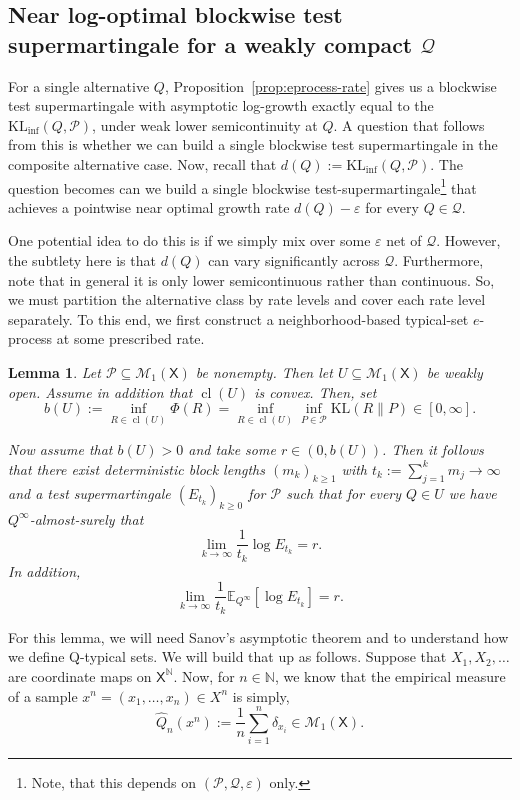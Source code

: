 \documentclass[11pt]{article}
\newcommand{\KL}{\mathrm{KL}}
\newcommand{\KLinf}{\mathrm{KL}_{\mathrm{inf}}}
\newcommand{\E}{\mathbb{E}}
\newcommand{\Pcal}{\mathcal{P}}
\newcommand{\Qcal}{\mathcal{Q}}
\newcommand{\X}{\mathsf{X}}
\DeclareMathOperator{\cl}{cl}
\newtheorem{lemma}[theorem]{Lemma}
\theoremstyle{definition}
\theoremstyle{definition}
\begin{document}
\subsection{Near log-optimal blockwise test supermartingale for a weakly compact $\Qcal$}
For a single alternative $Q$, Proposition~\ref{prop:eprocess-rate} gives us a blockwise test supermartingale with asymptotic log-growth exactly equal to the $\KLinf(Q,\Pcal)$, under weak lower semicontinuity at $Q$. A question that follows from this is whether we can build a single blockwise test supermartingale in the composite alternative case. Now, recall that $d(Q):=\KLinf(Q,\Pcal)$. The question becomes can we build a single blockwise test-supermartingale\footnote{Note, that this depends on $(\Pcal, \Qcal,\varepsilon)$ only.} that achieves a pointwise near optimal growth rate $d(Q)-\varepsilon$ for every $Q\in\Qcal$.

One potential idea to do this is if we simply mix over some $\varepsilon$ net of $\Qcal$. However, the subtlety here is that $d(Q)$ can vary significantly across $\Qcal$. Furthermore, note that in general it is only lower semicontinuous rather than continuous. So, we must partition the alternative class by rate levels and cover each rate level separately. To this end, we first construct a neighborhood-based typical-set $e$-process at some prescribed rate.

\begin{lemma}\label{lem:typicalset-eprocess-fixedU}
Let $\Pcal\subseteq\mathcal M_1(\X)$ be nonempty. Then let $U\subseteq\mathcal M_1(\X)$ be weakly open. Assume in addition that $\cl(U)$ is convex. Then, set
\[
b(U):=\inf_{R\in\cl(U)}\Phi(R)=\inf_{R\in\cl(U)}\inf_{P\in\Pcal}\KL(R\|P)\in[0,\infty].
\]

\noindent Now assume that $b(U)>0$ and take some $r\in(0, b(U))$. Then it follows that there exist deterministic block lengths $(m_k)_{k\ge 1}$ with $t_k:=\sum_{j=1}^k m_j\to\infty$ and a test supermartingale $(E_{t_k})_{k\ge 0}$ for $\Pcal$ such that for every $Q\in U$ we have $Q^\infty$-almost-surely that
\[
\lim_{k\to\infty}\frac{1}{t_k}\log E_{t_k} = r.
\]
In addition,
\[
\lim_{k\to\infty}\frac{1}{t_k}\E_{Q^\infty}[\log E_{t_k}] = r.
\]
\end{lemma}

For this lemma, we will need Sanov's asymptotic theorem and to understand how we define Q-typical sets. We will build that up as follows. Suppose that $X_1, X_2,\dots$ are coordinate maps on $\X^\mathbb{N}$. Now, for $n\in\mathbb{N}$, we know that the empirical measure of a sample $x^n=(x_1,\dots,x_n)\in X^n$ is simply,
\[
\widehat{Q}_n(x^n) :=\frac{1}{n}\sum_{i=1}^n \delta_{x_i} \in\mathcal{M}_1(\X).
\]
\end{document}
